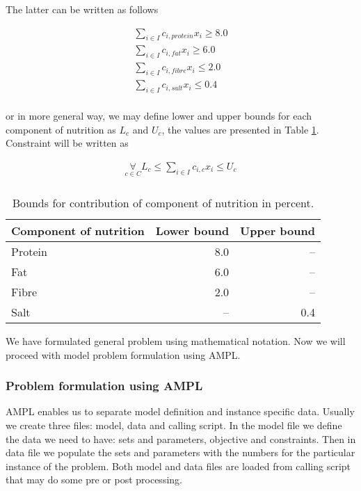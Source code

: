 The latter can be written as follows

\begin{align}
   \mathop\sum\limits_{i \in I} c_{i,protein} x_i \geq 8.0 \\
   \mathop\sum\limits_{i \in I} c_{i,fat} x_i \geq 6.0 \\
   \mathop\sum\limits_{i \in I} c_{i,fibre} x_i \leq 2.0 \\ 
   \mathop\sum\limits_{i \in I} c_{i,salt} x_i \leq 0.4 \\
\end{align}

or in more general way, we may define lower and upper bounds for each component of nutrition as $L_c$ and $U_c$, the values are presented in Table \ref{ampl:whiskas:bounds}. Constraint will be written as

\begin{align}
   \mathop\forall\limits_{c \in C} L_c \leq \mathop\sum\limits_{i \in I} c_{i,c} x_i \leq U_c \\
\end{align}

\begin{table}
  \centering
  \begin{tabular}{| l | r | r |}
    \hline
    \textbf{Component of nutrition} & \textbf{Lower bound} & \textbf{Upper bound} \\ \hline
    Protein & 8.0 & -- \\ \hline
    Fat & 6.0 & -- \\ \hline
    Fibre & 2.0 & -- \\ \hline
    Salt & -- & 0.4 \\ \hline
  \end{tabular}
  \caption{Bounds for contribution of component of nutrition in percent.}
  \label{ampl:whiskas:bounds}  
\end{table}



We have formulated general problem using mathematical notation. Now we will proceed with model problem formulation using AMPL.

\subsubsection{Problem formulation using AMPL}

AMPL enables us to separate model definition and instance specific data. Usually we create three files: model, data and calling script. In the model file we define the data we need to have: sets and parameters, objective and constraints. Then in data file we populate the sets and parameters with the numbers for the particular instance of the problem. Both model and data files are loaded from calling script that may do some pre or post processing.

